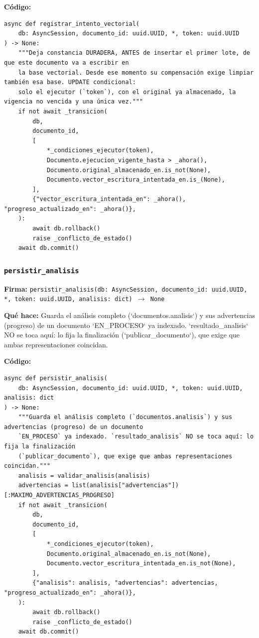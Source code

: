 \documentclass[11pt,a4paper]{article}
\begin{document}
\textbf{Código:}
\begin{lstlisting}
async def registrar_intento_vectorial(
    db: AsyncSession, documento_id: uuid.UUID, *, token: uuid.UUID
) -> None:
    """Deja constancia DURADERA, ANTES de insertar el primer lote, de que este documento va a escribir en
    la base vectorial. Desde ese momento su compensación exige limpiar también esa base. UPDATE condicional:
    solo el ejecutor (`token`), con el original ya almacenado, la vigencia no vencida y una única vez."""
    if not await _transicion(
        db,
        documento_id,
        [
            *_condiciones_ejecutor(token),
            Documento.ejecucion_vigente_hasta > _ahora(),
            Documento.original_almacenado_en.is_not(None),
            Documento.vector_escritura_intentada_en.is_(None),
        ],
        {"vector_escritura_intentada_en": _ahora(), "progreso_actualizado_en": _ahora()},
    ):
        await db.rollback()
        raise _conflicto_de_estado()
    await db.commit()
\end{lstlisting}

\subsubsection*{\texttt{persistir\_analisis}}
\textbf{Firma:} \texttt{persistir\_analisis(db: AsyncSession, documento\_id: uuid.UUID, *, token: uuid.UUID, analisis: dict) $\rightarrow$ None}

\textbf{Qué hace:} Guarda el análisis completo (`documentos.analisis`) y sus advertencias (progreso) de un documento
`EN\_PROCESO` ya indexado. `resultado\_analisis` NO se toca aquí: lo fija la finalización
(`publicar\_documento`), que exige que ambas representaciones coincidan.

\textbf{Código:}
\begin{lstlisting}
async def persistir_analisis(
    db: AsyncSession, documento_id: uuid.UUID, *, token: uuid.UUID, analisis: dict
) -> None:
    """Guarda el análisis completo (`documentos.analisis`) y sus advertencias (progreso) de un documento
    `EN_PROCESO` ya indexado. `resultado_analisis` NO se toca aquí: lo fija la finalización
    (`publicar_documento`), que exige que ambas representaciones coincidan."""
    analisis = validar_analisis(analisis)
    advertencias = list(analisis["advertencias"])[:MAXIMO_ADVERTENCIAS_PROGRESO]
    if not await _transicion(
        db,
        documento_id,
        [
            *_condiciones_ejecutor(token),
            Documento.original_almacenado_en.is_not(None),
            Documento.vector_escritura_intentada_en.is_not(None),
        ],
        {"analisis": analisis, "advertencias": advertencias, "progreso_actualizado_en": _ahora()},
    ):
        await db.rollback()
        raise _conflicto_de_estado()
    await db.commit()
\end{lstlisting}
\end{document}
